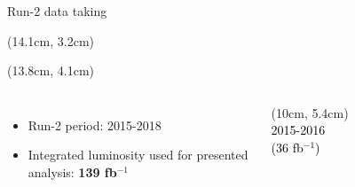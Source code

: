 \begin{frame}{Run-2 data taking}
    
\begin{textblock*}{5cm}(14.1cm, 3.2cm) %
\end{textblock*}
\begin{textblock*}{5cm}(13.8cm, 4.1cm) %
\end{textblock*}
\begin{columns}
\begin{itemize}
    \item Run-2 period: 2015-2018
    \item Integrated luminosity used for presented analysis: \textbf{139 fb$^{-1}$}
\end{itemize}




\begin{textblock*}{5cm}(10cm, 5.4cm) %
  \textcolor{black}{2015-2016 \\ (36 fb$^{-1}$)}
\end{textblock*}

\begin{figure}
    \centering
\end{figure}


\end{columns}
\end{frame}
